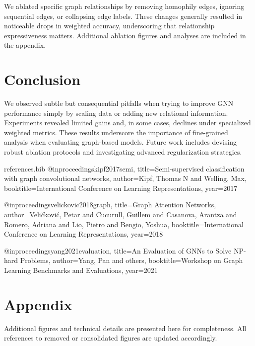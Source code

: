 \documentclass{article}
\begin{document}
We ablated specific graph relationships by removing homophily edges, ignoring sequential edges, or collapsing edge labels. These changes generally resulted in noticeable drops in weighted accuracy, underscoring that relationship expressiveness matters. Additional ablation figures and analyses are included in the appendix.

\section{Conclusion}
We observed subtle but consequential pitfalls when trying to improve GNN performance simply by scaling data or adding new relational information. Experiments revealed limited gains and, in some cases, declines under specialized weighted metrics. These results underscore the importance of fine-grained analysis when evaluating graph-based models. Future work includes devising robust ablation protocols and investigating advanced regularization strategies.

\clearpage


\begin{filecontents}{references.bib}
@inproceedings{kipf2017semi,
  title={Semi-supervised classification with graph convolutional networks},
  author={Kipf, Thomas N and Welling, Max},
  booktitle={International Conference on Learning Representations},
  year={2017}
}

@inproceedings{velickovic2018graph,
  title={Graph Attention Networks},
  author={Veli{\v{c}}kovi{\'c}, Petar and Cucurull, Guillem and Casanova, Arantza and Romero, Adriana and Lio, Pietro and Bengio, Yoshua},
  booktitle={International Conference on Learning Representations},
  year={2018}
}

@inproceedings{yang2021evaluation,
  title={An Evaluation of GNNs to Solve NP-hard Problems},
  author={Yang, Pan and others},
  booktitle={Workshop on Graph Learning Benchmarks and Evaluations},
  year={2021}
}
\end{filecontents}



\appendix
\section*{Appendix}
Additional figures and technical details are presented here for completeness. All references to removed or consolidated figures are updated accordingly.
\end{document}
